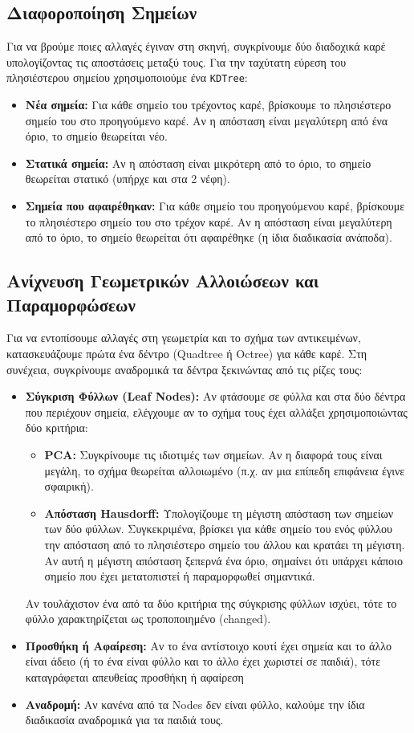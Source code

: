 \documentclass[acmsmall,screen,nonacm]{acmart}
\begin{document}
	\subsection{Διαφοροποίηση Σημείων}
	Για να βρούμε ποιες αλλαγές έγιναν στη σκηνή, συγκρίνουμε δύο διαδοχικά καρέ υπολογίζοντας τις αποστάσεις μεταξύ τους. Για την ταχύτατη εύρεση του πλησιέστερου σημείου χρησιμοποιούμε ένα \texttt{KDTree}:
	\begin{itemize}
		\item \textbf{Νέα σημεία:} Για κάθε σημείο του τρέχοντος καρέ, βρίσκουμε το πλησιέστερο σημείο του στο προηγούμενο καρέ. Αν η απόσταση είναι μεγαλύτερη από ένα όριο, το σημείο θεωρείται νέο.
		\item \textbf{Στατικά σημεία:} Αν η απόσταση είναι μικρότερη από το όριο, το σημείο θεωρείται στατικό (υπήρχε και στα 2 νέφη).
		\item \textbf{Σημεία που αφαιρέθηκαν:} Για κάθε σημείο του προηγούμενου καρέ, βρίσκουμε το πλησιέστερο σημείο του στο τρέχον καρέ. Αν η απόσταση είναι μεγαλύτερη από το όριο, το σημείο θεωρείται ότι αφαιρέθηκε (η ίδια διαδικασία ανάποδα).
	\end{itemize}
	
	\subsection{Ανίχνευση Γεωμετρικών Αλλοιώσεων και Παραμορφώσεων}
	Για να εντοπίσουμε αλλαγές στη γεωμετρία και το σχήμα των αντικειμένων, κατασκευάζουμε πρώτα ένα δέντρο (Quadtree ή Octree) για κάθε καρέ. Στη συνέχεια, συγκρίνουμε αναδρομικά τα δέντρα ξεκινώντας από τις ρίζες τους:
	\begin{itemize}
		\item \textbf{Σύγκριση Φύλλων (Leaf Nodes):} Αν φτάσουμε σε φύλλα και στα δύο δέντρα που περιέχουν σημεία, ελέγχουμε αν το σχήμα τους έχει αλλάξει χρησιμοποιώντας δύο κριτήρια:
		\begin{itemize}
			\item \textbf{PCA:} Συγκρίνουμε τις ιδιοτιμές των σημείων. Αν η διαφορά τους είναι μεγάλη, το σχήμα θεωρείται αλλοιωμένο (π.χ. αν μια επίπεδη επιφάνεια έγινε σφαιρική).
			\item \textbf{Απόσταση Hausdorff:} Υπολογίζουμε τη μέγιστη απόσταση των σημείων των δύο φύλλων. Συγκεκριμένα, βρίσκει για κάθε σημείο του ενός φύλλου την απόσταση από το πλησιέστερο σημείο του άλλου και κρατάει τη μέγιστη. Αν αυτή η μέγιστη απόσταση ξεπερνά ένα όριο, σημαίνει ότι υπάρχει κάποιο σημείο που έχει μετατοπιστεί ή παραμορφωθεί σημαντικά.
		\end{itemize}
		Αν τουλάχιστον ένα από τα δύο κριτήρια της σύγκρισης φύλλων ισχύει, τότε το φύλλο χαρακτηρίζεται ως τροποποιημένο (changed).
		\item \textbf{Προσθήκη ή Αφαίρεση:} Αν το ένα αντίστοιχο κουτί έχει σημεία και το άλλο είναι άδειο (ή το ένα είναι φύλλο και το άλλο έχει χωριστεί σε παιδιά), τότε καταγράφεται απευθείας προσθήκη ή αφαίρεση
		\item \textbf{Αναδρομή:} Αν κανένα από τα Nodes δεν είναι φύλλο, καλούμε την ίδια διαδικασία αναδρομικά για τα παιδιά τους.
	\end{itemize}
	
\end{document}
